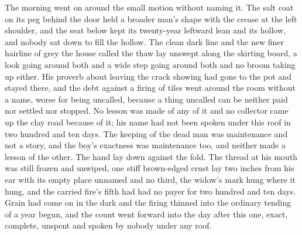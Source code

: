 The morning went on around the small motion without naming it. The salt coat on its peg behind the door held a broader man's shape with the crease at the left shoulder, and the seat below kept its twenty-year leftward lean and its hollow, and nobody sat down to fill the hollow. The clean dark line and the new finer hairline of grey the house called the thaw lay unswept along the skirting board, a look going around both and a wide step going around both and no broom taking up either. His proverb about leaving the crack showing had gone to the pot and stayed there, and the debt against a firing of tiles went around the room without a name, worse for being uncalled, because a thing uncalled can be neither paid nor settled nor stopped. No lesson was made of any of it and no collector came up the clay road because of it; his name had not been spoken under this roof in two hundred and ten days. The keeping of the dead man was maintenance and not a story, and the boy's exactness was maintenance too, and neither made a lesson of the other. The hand lay down against the fold. The thread at his mouth was still frozen and unwiped, one stiff brown-edged crust lay two inches from his ear with its empty place unnamed and no third, the widow's mark hung where it hung, and the carried fire's fifth had had no payer for two hundred and ten days. Grain had come on in the dark and the firing thinned into the ordinary tending of a year begun, and the count went forward into the day after this one, exact, complete, unspent and spoken by nobody under any roof.

